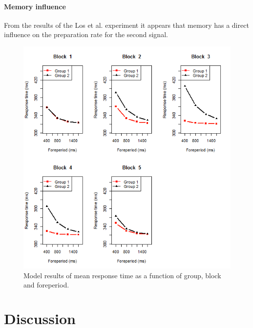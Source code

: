 \documentclass[10pt,letterpaper]{article}
\begin{document}
\paragraph{Memory influence}
From the results of the Los et al. experiment it appears that memory has a direct influence on the preparation rate for the second signal. 

\begin{figure}
	\centering
	\includegraphics[width=\columnwidth]{5blocks2.png}
	\caption{Model results of mean response time as a function of group, block and foreperiod.}
	\label{5blocks}
\end{figure}

\section{Discussion}




\setlength{\bibleftmargin}{.125in}
\setlength{\bibindent}{-\bibleftmargin}

\end{document}
